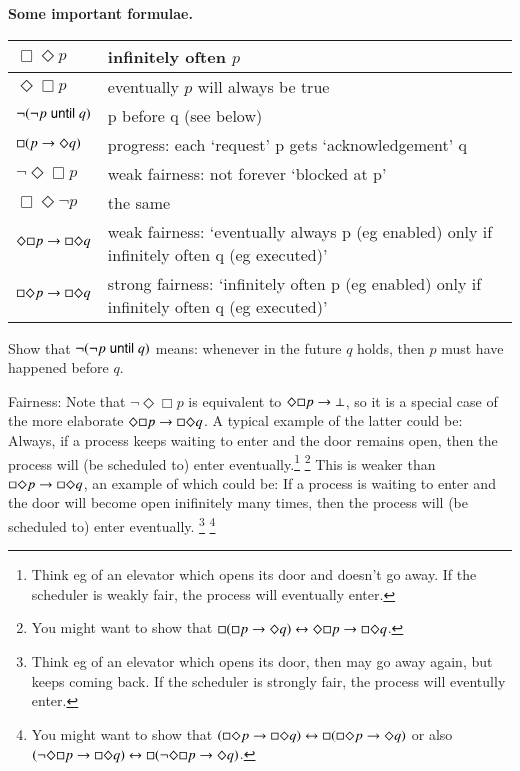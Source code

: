 \bigskip\noindent\textbf{Some important formulae. }
%
\begin{center}
\begin{tabular}{|l|l|}
  \hline
  $\Box\Diamond p$ & infinitely often $p$\\
  \hline
  $\Diamond\Box p$ & eventually $p$ will always be true\\
  \hline
  $\neg (\neg p \mathrel{\mathsf{until}} q)$ & p before q (see below) \\ 
  \hline
  $\Box(p\rightarrow\Diamond q)$ &  progress: each `request' p gets `acknowledgement' q\\
  \hline
  $\neg\Diamond\Box p$ &  weak fairness: not forever `blocked at p'\\
  \hline
  $\Box\Diamond\neg p$ &  the same\\
  \hline
  $\Diamond\Box p\rightarrow\Box\Diamond q$ &  weak fairness: `eventually always
  p (eg enabled) only if infinitely often q (eg executed)'\\
  \hline
  $\Box\Diamond p\rightarrow\Box\Diamond q$ &  strong fairness: `infinitely
  often p (eg enabled) only if infinitely often q (eg executed)'\\
  \hline
\end{tabular}
\end{center}

\medskip\noindent Show that $\neg (\neg p \mathrel{\mathsf{until}} q)$ means: whenever
in the future $q$ holds, then $p$ must have happened before $q$.

\medskip\noindent Fairness: Note that $\neg\Diamond\Box p$ is
equivalent to $\Diamond\Box p\rightarrow\bot$, so it is a special case of the
more elaborate $\Diamond\Box p\rightarrow\Box\Diamond q$. A typical example
of the latter could be: Always, if a process keeps waiting to enter and
the door remains open, then the process will (be scheduled to) enter
eventually.\footnote{Think eg of an elevator which opens its door and
  doesn't go away. If the scheduler is weakly fair, the process will
  eventually enter.} \footnote{You might want to show that $\Box(\Box
  p\rightarrow\Diamond q) \leftrightarrow \Diamond\Box p\rightarrow\Box\Diamond q$.} 
This is weaker than $\Box\Diamond p\rightarrow\Box\Diamond q$, an example of
which could be: If a process is waiting to enter and the door will
become open inifinitely many times, then the process will (be
scheduled to) enter eventually. \footnote{Think eg of an elevator
  which opens its door, then may go away again, but keeps coming
  back. If the scheduler is strongly fair, the process will eventully
  enter.} \footnote{You might want to show that $(\Box\Diamond
  p\rightarrow\Box\Diamond q) \leftrightarrow \Box(\Box\Diamond p \rightarrow \Diamond q)$ or
  also $(\neg\Diamond\Box p\rightarrow\Box\Diamond q) \leftrightarrow
  \Box(\neg\Diamond\Box p \rightarrow \Diamond q)$.}



